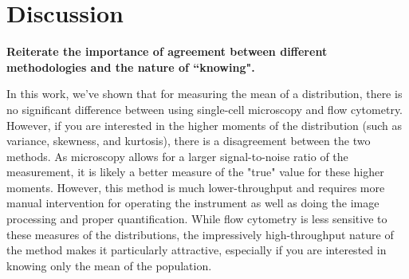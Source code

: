 \documentclass[letterpaper, 10pt]{article}
\begin{document}
\begin{figure}
  \label{fig:central_moments}
\end{figure}

\section*{Discussion}
\textbf{Reiterate the importance of agreement between different methodologies and the
nature of ``knowing". }

In this work, we've shown that for measuring the mean of a distribution, there is no
significant difference between using single-cell microscopy and flow cytometry.
However, if you are interested in the higher moments of the distribution (such
as variance, skewness, and kurtosis), there is a disagreement between the two
methods. As microscopy allows for a larger signal-to-noise ratio of the
measurement, it is likely a better measure of the "true" value for these higher
moments. However, this method is much lower-throughput and requires more manual
intervention for operating the instrument as well as doing the image processing
and proper quantification. While flow cytometry is less sensitive to these
measures of the distributions, the impressively high-throughput nature of the
method makes it particularly attractive, especially if you are interested in
knowing only the mean of the population.
\end{document}

